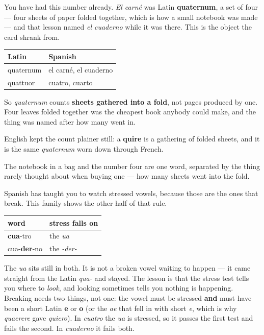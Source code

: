 \begin{cousinweb}
You have had this number already. \emph{El carné} was Latin \textbf{quaternum}, a set of four — four sheets of paper folded together, which is how a small notebook was made — and that lesson named \emph{el cuaderno} while it was there. This is the object the card shrank from.

\noindent
\begin{tabularx}{\linewidth}{@{}>{\raggedright\arraybackslash}X>{\raggedright\arraybackslash}X@{}}
\toprule
\textbf{Latin} & \textbf{Spanish} \\
\midrule
quaternum & el carné, el cuaderno \\
quattuor & cuatro, cuarto \\
\bottomrule
\end{tabularx}

So \emph{quaternum} counts \textbf{sheets gathered into a fold}, not pages produced by one. Four leaves folded together was the cheapest book anybody could make, and the thing was named after how many went in.

English kept the count plainer still: a \textbf{quire} is a gathering of folded sheets, and it is the same \emph{quaternum} worn down through French.

The notebook in a bag and the number four are one word, separated by the thing rarely thought about when buying one — how many sheets went into the fold.
\end{cousinweb}

\begin{grammarlens}[title={Grammar Lens: the ua that does not move}]
Spanish has taught you to watch stressed vowels, because those are the ones that break. This family shows the other half of that rule.

\noindent
\begin{tabularx}{\linewidth}{@{}>{\raggedright\arraybackslash}X>{\raggedright\arraybackslash}X@{}}
\toprule
\textbf{word} & \textbf{stress falls on} \\
\midrule
\textbf{cua}-tro & the \emph{ua} \\
cua-\textbf{der}-no & the \emph{-der-} \\
\bottomrule
\end{tabularx}

The \emph{ua} sits still in both. It is not a broken vowel waiting to happen — it came straight from the Latin \emph{qua-} and stayed. The lesson is that the stress test tells you where to \emph{look}, and looking sometimes tells you nothing is happening. Breaking needs two things, not one: the vowel must be stressed \textbf{and} must have been a short Latin \textbf{e} or \textbf{o} (or the \emph{ae} that fell in with short \emph{e}, which is why \emph{quaerere} gave \emph{quiero}). In \emph{cuatro} the \emph{ua} is stressed, so it passes the first test and fails the second. In \emph{cuaderno} it fails both.
\end{grammarlens}


